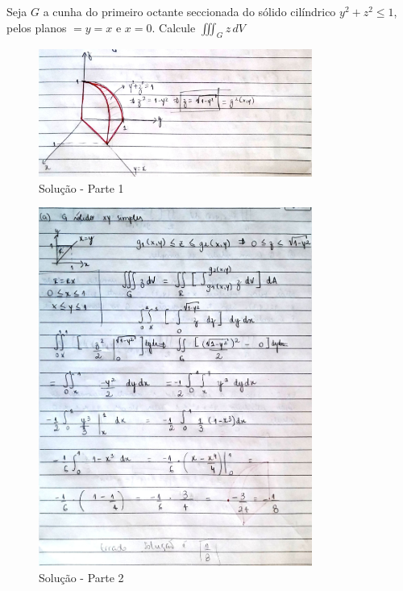 \documentclass[portugues, 11pt]{article}
\begin{document}
	\begin{exmp}
		Seja $G$ a cunha do primeiro octante seccionada do sólido cilíndrico $y^2+z^2 \leq 1$, pelos planos $=y=x$ e $x=0$.
		Calcule $\iiint_G z \,dV$ \\
		\begin{figure}[h]
			\centering
			\includegraphics[width=0.8\textwidth]{imagens/solucao_integral_tripla_1}
			\caption{Solução - Parte 1}
			\label{fig:int_tripla_1}			
		\end{figure}
		\begin{figure}[h]
			\centering
			\includegraphics[width=0.8\textwidth]{imagens/solucao_integral_tripla_2}
			\caption{Solução - Parte 2}
			\label{fig:int_tripla_2}			
		\end{figure}
	\end{exmp}

		
	



	
	
	

	
  
\end{document}
